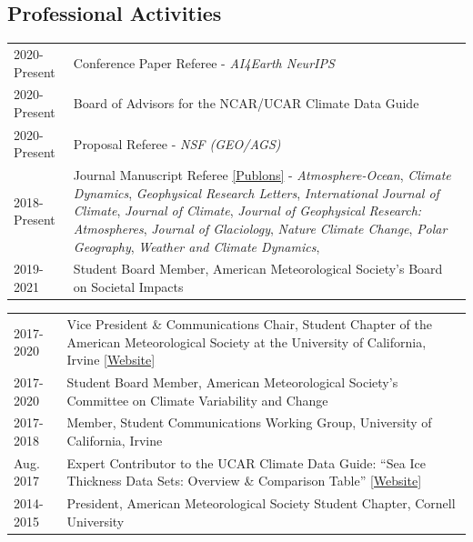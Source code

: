 \documentclass[margin,line,palatino,courier,10pt]{res}
\begin{document}
\begin{resume}
\section{\sc \textcolor{Cerulean}{\large{\textbf{Professional Activities}}}}
\vspace*{0.05in}
\begin{tabular}{@{}p{0.9in}p{4in}}
2020-Present & Conference Paper Referee - \textit{AI4Earth NeurIPS}\\
2020-Present & Board of Advisors for the NCAR/UCAR Climate Data Guide\\
2020-Present & Proposal Referee - \textit{NSF (GEO/AGS)}\\
2018-Present & Journal Manuscript Referee \href{https://publons.com/author/1521902/zachary-labe#profile}{[Publons]} - \textit{Atmosphere-Ocean}, \textit{Climate Dynamics}, \textit{Geophysical Research Letters}, \textit{International Journal of Climate}, \textit{Journal of Climate}, \textit{Journal of Geophysical Research: Atmospheres}, \textit{Journal of Glaciology}, \textit{Nature Climate Change}, \textit{Polar Geography}, \textit{Weather and Climate Dynamics}, \\
2019-2021& Student Board Member, American Meteorological Society's Board on Societal Impacts\\
\end{tabular}
\begin{tabular}{@{}p{0.9in}p{4in}}
2017-2020 & Vice President \& Communications Chair, Student Chapter of the American Meteorological Society at the University of California, Irvine \href{http://sites.uci.edu/zotcams/}{[Website]}\\
2017-2020 & Student Board Member, American Meteorological Society's Committee on Climate Variability and Change\\
2017-2018 & Member, Student Communications Working Group, University of California, Irvine\\
Aug. 2017 & Expert Contributor to the UCAR Climate Data Guide: ``Sea Ice Thickness Data Sets: Overview \& Comparison Table'' \href{https://climatedataguide.ucar.edu/climate-data/sea-ice-thickness-data-sets-overview-comparison-table}{[Website]}\\
2014-2015 & President, American Meteorological Society Student Chapter, Cornell University\\
\end{tabular}


\end{resume}
\end{document}
